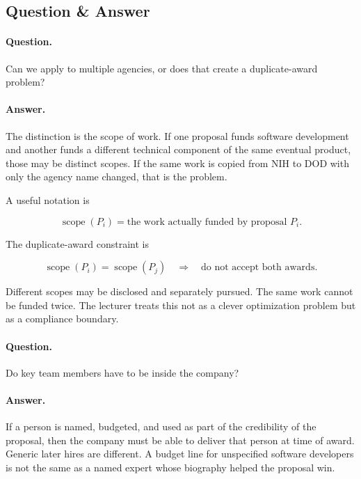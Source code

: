 \subsection{Question \& Answer}

\paragraph{Question.}
Can we apply to multiple agencies, or does that create a duplicate-award problem?

\paragraph{Answer.}
The distinction is the scope of work. If one proposal funds software development and another funds a different technical component of the same eventual product, those may be distinct scopes. If the same work is copied from NIH to DOD with only the agency name changed, that is the problem.

A useful notation is

\begin{equation}
\operatorname{scope}(P_i)=\text{the work actually funded by proposal }P_i.
\end{equation}

The duplicate-award constraint is

\begin{equation}
\operatorname{scope}(P_i)=\operatorname{scope}(P_j)
\quad\Longrightarrow\quad
\text{do not accept both awards.}
\end{equation}

Different scopes may be disclosed and separately pursued. The same work cannot be funded twice. The lecturer treats this not as a clever optimization problem but as a compliance boundary.

\paragraph{Question.}
Do key team members have to be inside the company?

\paragraph{Answer.}
If a person is named, budgeted, and used as part of the credibility of the proposal, then the company must be able to deliver that person at time of award. Generic later hires are different. A budget line for unspecified software developers is not the same as a named expert whose biography helped the proposal win.

